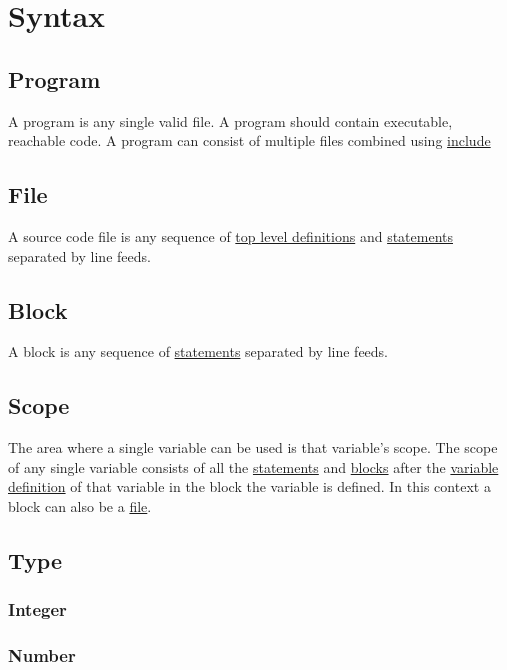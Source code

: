 \section{Syntax}
\label{syntax}

\subsection{Program}
\label{program}
A program is any single valid file.
A program should contain executable, reachable code.
A program can consist of multiple files combined using \hyperref[stat:include]{include}

\subsection{File}
\label{file}
A source code file is any sequence of \hyperref[tld]{top level definitions}
and \hyperref[statement]{statements} separated by line feeds.

\subsection{Block}
\label{block}
A block is any sequence of \hyperref[statement]{statements} separated by line feeds.

\subsection{Scope}
\label{scope}
The area where a single variable can be used is that variable's scope.
The scope of any single variable consists of all the \hyperref[statement]{statements} and \hyperref[block]{blocks}
after the \hyperref[stat:vardes]{variable definition} of that variable in the block the variable is defined.
In this context a block can also be a \hyperref[file]{file}.




\subsection{Type}
\label{type}

\subsubsection{Integer}
\label{type:Integer}
\subsubsection{Number}
\label{type:Number}
